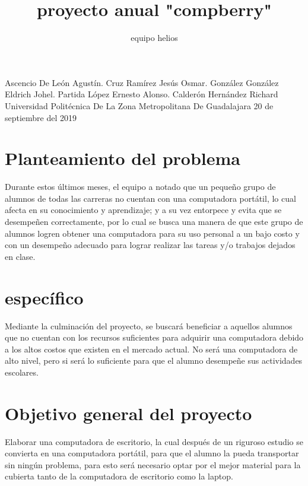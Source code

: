 \documentclass[14pt,letterpaper]{article}
\title{proyecto anual "compberry"}
\author{equipo helios}
\begin{document}
\maketitle
Ascencio De León Agustín.
\linebreak
Cruz Ramírez Jesús Osmar.
\linebreak
González González Eldrich Johel.
\linebreak
Partida López Ernesto Alonso.
\linebreak
Calderón Hernández Richard
\linebreak
\linebreak
\linebreak
Universidad Politécnica De La Zona Metropolitana De Guadalajara
20 de septiembre del 2019
\newpage
\section{ Planteamiento del problema} 
Durante estos últimos meses, el equipo a notado que un pequeño grupo de alumnos de todas las carreras no cuentan con una computadora portátil, lo cual afecta en su conocimiento y aprendizaje; y a su vez entorpece y evita que se desempeñen correctamente, por lo cual se busca una manera de que este grupo de alumnos logren obtener una computadora para su uso personal a un bajo costo y con un desempeño adecuado para lograr realizar las tareas y/o trabajos  dejados en clase.
\linebreak
\linebreak
\linebreak
\section{específico} 
Mediante la culminación del proyecto, se buscará beneficiar a aquellos alumnos que no cuentan con los recursos suficientes para adquirir una computadora debido a los altos costos que existen en el mercado actual. No será una computadora de alto nivel, pero si será lo suficiente para que el alumno desempeñe sus actividades escolares.
\linebreak
\linebreak
\linebreak
\section{Objetivo general del proyecto} 
Elaborar una computadora de escritorio, la cual después de un riguroso estudio se convierta en una computadora portátil, para que el alumno la pueda transportar sin ningún problema, para esto será necesario optar por el mejor material para la cubierta tanto de la computadora de escritorio como la laptop.
\linebreak
\linebreak
\linebreak
\end{document}
